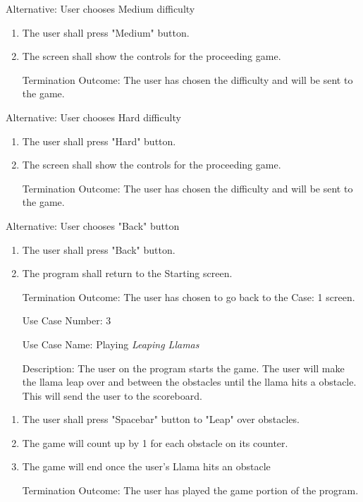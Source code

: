 \documentclass[10pt,conference,onecolumn,compsoc]{IEEEtran}
\begin{document}
Alternative: User chooses Medium difficulty
\begin{enumerate}
\item The user shall press "Medium" button.
\item The screen shall show the controls for the proceeding game.
\item[Termination Outcome:] The user has chosen the difficulty and will be sent to the game.
\end{enumerate}

Alternative: User chooses Hard difficulty
\begin{enumerate}
\item The user shall press "Hard" button.
\item The screen shall show the controls for the proceeding game.
\item[Termination Outcome:] The user has chosen the difficulty and will be sent to the game.
\end{enumerate}

Alternative: User chooses "Back" button
\begin{enumerate}
\item The user shall press "Back" button.
\item The program shall return to the Starting screen.
\item[Termination Outcome:] The user has chosen to go back to the Case: 1 screen.
\end{enumerate}


\begin{itemize}
\item[Use Case Number:] 3
\item[Use Case Name:] Playing \textit{Leaping Llamas}
\item[Description:] The user on the program starts the game. The user will make the llama leap over and between the obstacles until the llama hits a obstacle. This will send the user to the scoreboard.
\end{itemize}

\begin{enumerate}
\item The user shall press "Spacebar" button to "Leap" over obstacles.
\item The game will count up by 1 for each obstacle on its counter.
\item The game will end once the user's Llama hits an obstacle
\item[Termination Outcome:] The user has played the game portion of the program.
\end{enumerate}
\end{document}
